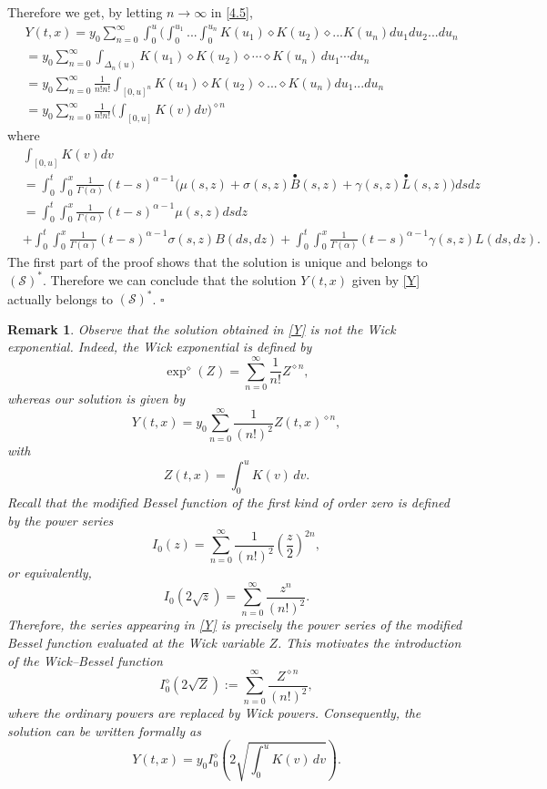 \documentclass[12pt]{article}%
\newtheorem{remark}[theorem]{Remark}
\newcommand{\fproof}{\hfill $\square$ \bigskip}
\numberwithin{equation}{section}
\def\S{\mathcal{S}}
\def\d{\diamond}
\def\d{\diamond}
\begin{document}
Therefore we get, by letting $n \rightarrow \infty$ in \eqref{4.5},
\begin{align}
&Y(t,x)= y_0 \sum_{n=0}^\infty \int_0^{u} \big( \int_0^{u_1} ... \int_0^{u_n} K(u_1)\d K(u_2) \d ... K(u_n) du_1 du_2 ...du_n\\
&=y_0
\sum_{n=0}^{\infty}
\int_{\Delta_n(u)}
K(u_1)\diamond K(u_2)\diamond\cdots\diamond K(u_{n})
\,du_{1}\cdots du_n\\
&=y_0 \sum_{n=0}^\infty \frac{1}{n! n!} \int_{[0,u]^n} K(u_1)\d K(u_2) \d ... \d K(u_n) du_1 ... du_n\\
&=y_0 \sum_{n=0}^\infty \frac{1}{n!n!} \Big(\int_{[0,u]} K(v) dv \Big)^{\d n} \label{Y}
\end{align}
where
\begin{align}
 &\int_{[0,u]} K(v) dv\nonumber\\
 &=\int_0^t \int_0^x \frac{1}{\Gamma(\alpha)}(t-s)^{\alpha -1}\Big(\mu(s,z) +\sigma(s,z)\overset{\bullet}{B}(s,z)  + \gamma(s,z) \overset{\bullet}{L}(s,z)\Big)ds dz\nonumber \\
 &= \int_0^t\int_0^x \frac{1}{\Gamma(\alpha)}(t-s)^{\alpha -1}\mu(s,z)ds dz\nonumber \\
 &+\int_0^t\int_0^x  \frac{1}{\Gamma(\alpha)}(t-s)^{\alpha -1}\sigma(s,z) B(ds,dz) +\int_0^t\int_0^x  \frac{1}{\Gamma(\alpha)}(t-s)^{\alpha -1}\gamma(s,z) L(ds,dz).
\end{align}
The first part of the proof shows that the solution is unique and belongs to  $(\S)^{*}$. Therefore we can conclude that the solution $Y(t,x)$ given by \eqref{Y} actually belongs to $(\S)^{*}$.
\fproof

\begin{remark}
    Observe that the solution obtained in \eqref{Y} is not the Wick exponential. Indeed, the Wick exponential is defined by
\[
\exp^{\diamond}(Z)
=
\sum_{n=0}^{\infty}
\frac{1}{n!}
Z^{\diamond n},
\]
whereas our solution is given by
\[
Y(t,x)
=
y_0
\sum_{n=0}^{\infty}
\frac{1}{(n!)^2}
Z(t,x)^{\diamond n},
\]
with
\[
Z(t,x)
=
\int_0^u K(v)\,dv.
\]
Recall that the modified Bessel function of the first kind of order zero is defined by the power series
\[
I_0(z)
=
\sum_{n=0}^{\infty}
\frac{1}{(n!)^2}
\left(\frac{z}{2}\right)^{2n},
\]
or equivalently,
\[
I_0(2\sqrt{z})
=
\sum_{n=0}^{\infty}
\frac{z^n}{(n!)^2}.
\]
Therefore, the series appearing in \eqref{Y} is precisely the power series of the modified Bessel function evaluated at the Wick variable \(Z\). This motivates the introduction of the Wick--Bessel function
\[
I_0^{\diamond}(2\sqrt{Z})
:=
\sum_{n=0}^{\infty}
\frac{Z^{\diamond n}}{(n!)^2},
\]
where the ordinary powers are replaced by Wick powers.
Consequently, the solution can be written formally as
\begin{equation}
    Y(t,x)
=
y_0
I_0^{\diamond}
\!\left(
2\sqrt{
\int_0^u K(v)\,dv
}
\right).
\end{equation}
\end{remark}
\end{document}
